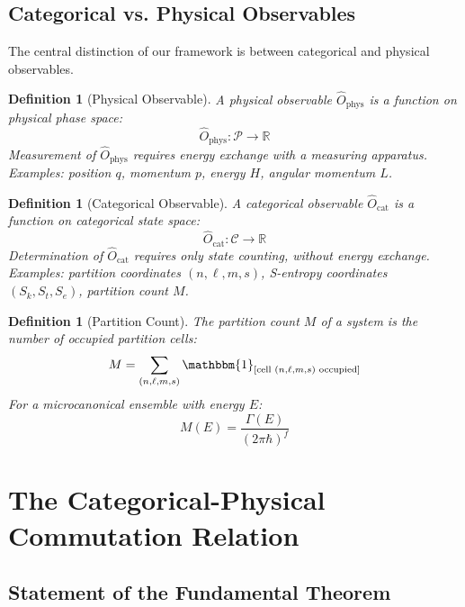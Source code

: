\documentclass[twocolumn,10pt,twoside]{article}
\newtheorem{definition}[theorem]{Definition}
\newcommand{\R}{\mathbb{R}}
\newcommand{\Cat}{\mathcal{C}}
\newcommand{\Phys}{\mathcal{P}}
\newcommand{\Ocat}{\hat{O}_{\mathrm{cat}}}
\newcommand{\Ophys}{\hat{O}_{\mathrm{phys}}}
\newcommand{\partcoord}{(n,\ell,m,s)}
\newcommand{\sentcoord}{(S_k,S_t,S_e)}
\begin{document}
\subsection{Categorical vs. Physical Observables}

The central distinction of our framework is between categorical and physical observables.

\begin{definition}[Physical Observable]
\label{def:physical_observable}
A physical observable $\Ophys$ is a function on physical phase space:
\begin{equation}
\Ophys: \Phys \to \R
\end{equation}
Measurement of $\Ophys$ requires energy exchange with a measuring apparatus. Examples: position $q$, momentum $p$, energy $H$, angular momentum $L$.
\end{definition}

\begin{definition}[Categorical Observable]
\label{def:categorical_observable}
A categorical observable $\Ocat$ is a function on categorical state space:
\begin{equation}
\Ocat: \Cat \to \R
\end{equation}
Determination of $\Ocat$ requires only state counting, without energy exchange. Examples: partition coordinates $\partcoord$, S-entropy coordinates $\sentcoord$, partition count $M$.
\end{definition}

\begin{definition}[Partition Count]
\label{def:partition_count}
The partition count $M$ of a system is the number of occupied partition cells:
\begin{equation}
M = \sum_{\partcoord} \mathbbm{1}_{[\text{cell } \partcoord \text{ occupied}]}
\end{equation}
For a microcanonical ensemble with energy $E$:
\begin{equation}
M(E) = \frac{\Gamma(E)}{(2\pi\hbar)^f}
\label{eq:partition_count}
\end{equation}
\end{definition}

\section{The Categorical-Physical Commutation Relation}

\subsection{Statement of the Fundamental Theorem}
\end{document}
